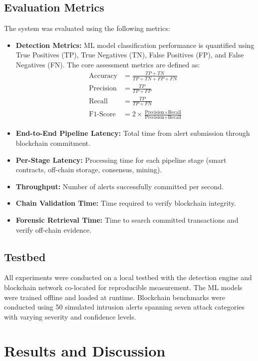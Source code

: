 \documentclass[conference]{IEEEtran}
\begin{document}
\subsection{Evaluation Metrics}
The system was evaluated using the following metrics:
\begin{itemize}
    \item \textbf{Detection Metrics:} ML model classification performance is quantified using True Positives (TP), True Negatives (TN), False Positives (FP), and False Negatives (FN). The core assessment metrics are defined as:
\begin{align}
\text{Accuracy} &= \frac{TP + TN}{TP + TN + FP + FN} \\[1ex]
\text{Precision} &= \frac{TP}{TP + FP} \\
\text{Recall} &= \frac{TP}{TP + FN} \\
\text{F1-Score} &= 2 \times \frac{\text{Precision} \times \text{Recall}}{\text{Precision} + \text{Recall}}
\end{align}
    \item \textbf{End-to-End Pipeline Latency:} Total time from alert submission through blockchain commitment.
    \item \textbf{Per-Stage Latency:} Processing time for each pipeline stage (smart contracts, off-chain storage, consensus, mining).
    \item \textbf{Throughput:} Number of alerts successfully committed per second.
    \item \textbf{Chain Validation Time:} Time required to verify blockchain integrity.
    \item \textbf{Forensic Retrieval Time:} Time to search committed transactions and verify off-chain evidence.
\end{itemize}

\subsection{Testbed}
All experiments were conducted on a local testbed with the detection engine and blockchain network co-located for reproducible measurement. The ML models were trained offline and loaded at runtime. Blockchain benchmarks were conducted using 50 simulated intrusion alerts spanning seven attack categories with varying severity and confidence levels.


\section{Results and Discussion}
\end{document}
